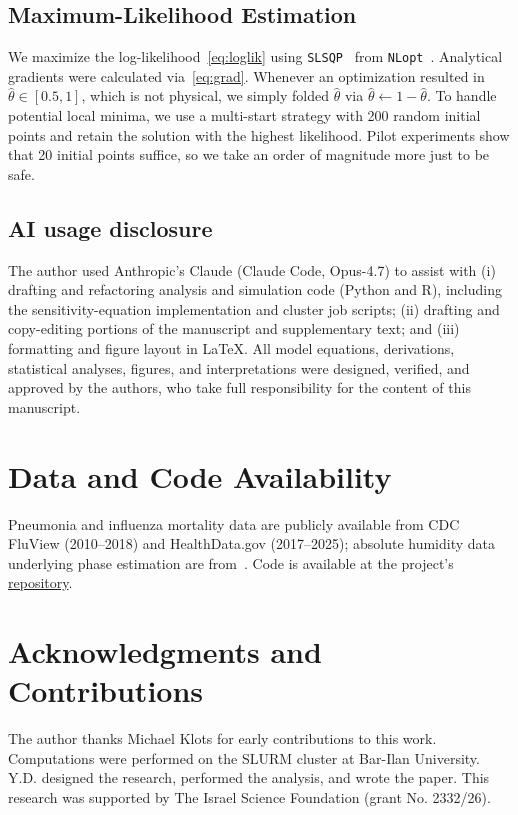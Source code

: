 \documentclass[11pt]{article}
\begin{document}
\subsection{Maximum-Likelihood Estimation}\label{subsec:mle}
We maximize the log-likelihood~\eqref{eq:loglik} using
\texttt{SLSQP}~\citep{kraft1988} from
\texttt{NLopt}~\citep{NLopt}. Analytical gradients were calculated
via~\eqref{eq:grad}. Whenever an optimization resulted in
$\hat{\theta} \in [0.5,1]$, which is not physical, we simply folded
$\hat{\theta}$ via $\hat{\theta} \leftarrow 1-\hat{\theta}$. To handle
potential local minima, we use a multi-start strategy with 200 random
initial points and retain the solution with the highest
likelihood. Pilot experiments show that 20 initial points suffice, so
we take an order of magnitude more just to be safe.

\subsection{AI usage disclosure}
The author used Anthropic's Claude (Claude Code, Opus-4.7) to assist
with (i) drafting and refactoring analysis and simulation code (Python
and R), including the sensitivity-equation implementation and cluster
job scripts; (ii) drafting and copy-editing portions of the manuscript
and supplementary text; and (iii) formatting and figure layout in
\LaTeX. All model equations, derivations, statistical analyses,
figures, and interpretations were designed, verified, and approved by
the authors, who take full responsibility for the content of this
manuscript.

\section{Data and Code Availability}
Pneumonia and influenza mortality data are publicly available from CDC
FluView (2010--2018) and HealthData.gov (2017--2025); absolute
humidity data underlying phase estimation are
from~\citep{daon2025}. Code is available at the project's
\href{https://github.com/yairdaon/contacts}{repository}.

\section{Acknowledgments and Contributions}
The author thanks Michael Klots for early contributions to this
work. Computations were performed on the SLURM cluster at Bar-Ilan
University. Y.D. designed the research, performed the analysis, and
wrote the paper. This research was supported by The Israel Science Foundation
(grant No. 2332/26).





\end{document}
